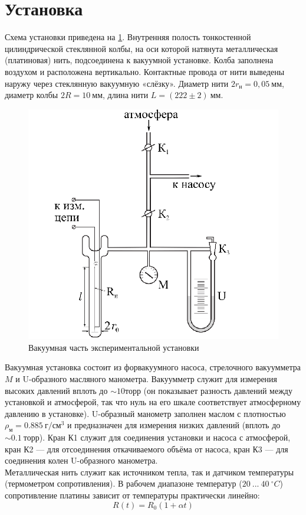 \documentclass[12pt]{article}
\begin{document}
    \section{Установка}
        Схема установки приведена на \ref{vacuum_part}. Внутренняя полость тонкостенной
        цилиндрической стеклянной колбы, на оси которой натянута металлическая
        (платиновая) нить, подсоединена к вакуумной установке. Колба заполнена
        воздухом и расположена вертикально. Контактные провода от нити выведены
        наружу через стеклянную вакуумную «слёзку».
        Диаметр нити $2r_{\text{н}} = 0,05~\text{мм}$, диаметр колбы $2R = 10~\text{мм}$,
        длина нити $L = (222\pm 2)~\text{мм}$.
        \begin{figure}[H]
            \centering
            \includegraphics[width=0.4\linewidth]{vacuum.png}
            \caption{Вакуумная часть экспериментальной установки}
            \label{vacuum_part}
        \end{figure}
        Вакуумная установка состоит из форвакуумного насоса, стрелочного вакуумметра $M$ и U-образного масляного манометра. Вакуумметр служит для
        измерения высоких давлений вплоть до $\sim 10 \text{торр}$ (он показывает разность
        давлений между установкой и атмосферой, так что нуль на его шкале соответствует атмосферному давлению в установке). U-образный манометр
        заполнен маслом с плотностью $\rho_{\text{м}} = 0.885\ \text{г}/\text{см}^3$ и предназначен для измерения
        низких давлений (вплоть до $\sim 0.1\ \text{торр}$). Кран К1 служит для соединения установки и насоса с атмосферой, кран К2 — для отсоединения откачиваемого
        объёма от насоса, кран К3 — для соединения колен U-образного манометра.\\
        Металлическая нить служит как источником тепла, так и датчиком температуры
        (термометром сопротивления). В рабочем диапазоне температур ($20\ ...\ 40\ ^{\circ} C$)
        сопротивление платины зависит от температуры практически линейно:
        \begin{equation}\label{sopr}
            R(t) = R_0(1+\alpha t)
        \end{equation}
\end{document}
